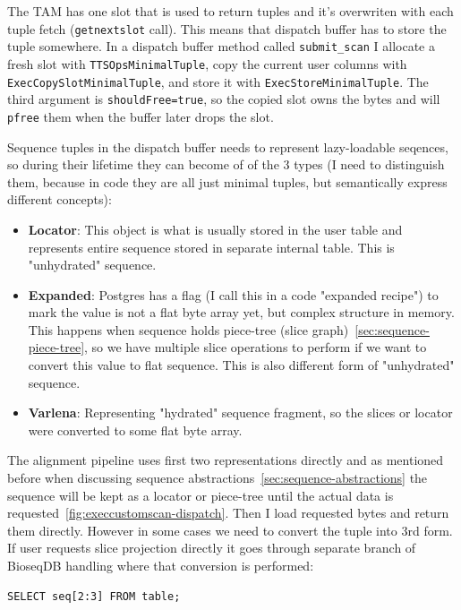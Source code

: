 The TAM has one slot that is used to return tuples and it's overwriten with each tuple fetch (\texttt{getnextslot} call). This means that dispatch buffer has to store the tuple somewhere.
In a dispatch buffer method called \texttt{submit\_scan} I allocate a fresh slot with \texttt{TTSOpsMinimalTuple}, copy the current user columns with \texttt{ExecCopySlotMinimalTuple}, 
and store it with \texttt{ExecStoreMinimalTuple}.
The third argument is \texttt{shouldFree=true}, so the copied slot owns the bytes and will \texttt{pfree} them when the buffer later drops the slot.

Sequence tuples in the dispatch buffer needs to represent lazy-loadable seqences, so during their lifetime they can become of of the 3 types (I need to distinguish them, because in code they are all just minimal tuples, but semantically express different  concepts):
\begin{itemize}
  \item \textbf{Locator}: This object is what is usually stored in the user table and represents entire sequence stored in separate internal table. This is "unhydrated" sequence.
  \item \textbf{Expanded}: Postgres has a flag  (I call this in a code "expanded recipe") to mark the value is not a flat byte array yet, but complex structure in memory. This happens when sequence holds piece-tree (slice graph)~\ref{sec:sequence-piece-tree}, so we have multiple slice operations to perform if we want to convert this value to flat sequence. This is also different form of "unhydrated" sequence.
  \item \textbf{Varlena}: Representing "hydrated" sequence fragment, so the slices or locator were converted to some flat byte array.
\label{lst:tuple-types}
\end{itemize}
The alignment pipeline uses first two representations directly and as mentioned before when discussing sequence abstractions~\ref{sec:sequence-abstractions} the sequence will be kept as a locator or piece-tree until the actual data is requested~\ref{fig:execcustomscan-dispatch}. Then I load requested bytes and return them directly.
However in some cases we need to convert the tuple into 3rd form. If user requests slice projection directly it goes through separate branch of BioseqDB handling where that conversion is performed:

\begin{minipage}{\linewidth}
\begin{lstlisting}[style=bioseq-search-sql,caption={Direct projection of a sequence slice.},label={lst:sequence-slice-projection}]
SELECT seq[2:3] FROM table;
\end{lstlisting}
\end{minipage}

